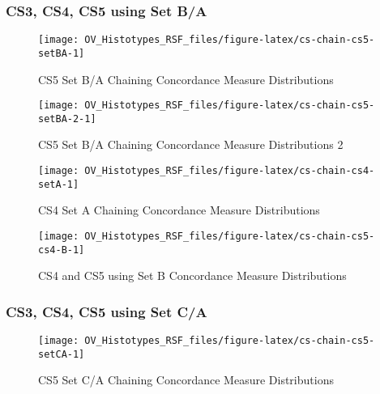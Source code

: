 \documentclass[
]{report}
\begin{document}
\hypertarget{cs3-cs4-cs5-using-set-ba}{%
\subsubsection{CS3, CS4, CS5 using Set B/A}\label{cs3-cs4-cs5-using-set-ba}}

\begin{figure}[H]

{\centering \texttt{[image: OV\_Histotypes\_RSF\_files/figure-latex/cs-chain-cs5-setBA-1]} 

}

\caption{CS5 Set B/A Chaining Concordance  Measure Distributions}\label{fig:cs-chain-cs5-setBA}
\end{figure}

\begin{figure}[H]

{\centering \texttt{[image: OV\_Histotypes\_RSF\_files/figure-latex/cs-chain-cs5-setBA-2-1]} 

}

\caption{CS5 Set B/A Chaining Concordance  Measure Distributions 2}\label{fig:cs-chain-cs5-setBA-2}
\end{figure}

\begin{figure}[H]

{\centering \texttt{[image: OV\_Histotypes\_RSF\_files/figure-latex/cs-chain-cs4-setA-1]} 

}

\caption{CS4 Set A Chaining Concordance Measure Distributions}\label{fig:cs-chain-cs4-setA}
\end{figure}

\begin{figure}[H]

{\centering \texttt{[image: OV\_Histotypes\_RSF\_files/figure-latex/cs-chain-cs5-cs4-B-1]} 

}

\caption{CS4 and CS5 using Set B Concordance Measure Distributions}\label{fig:cs-chain-cs5-cs4-B}
\end{figure}

\hypertarget{cs3-cs4-cs5-using-set-ca}{%
\subsubsection{CS3, CS4, CS5 using Set C/A}\label{cs3-cs4-cs5-using-set-ca}}

\begin{figure}[H]

{\centering \texttt{[image: OV\_Histotypes\_RSF\_files/figure-latex/cs-chain-cs5-setCA-1]} 

}

\caption{CS5 Set C/A Chaining Concordance  Measure Distributions}\label{fig:cs-chain-cs5-setCA}
\end{figure}
\end{document}
